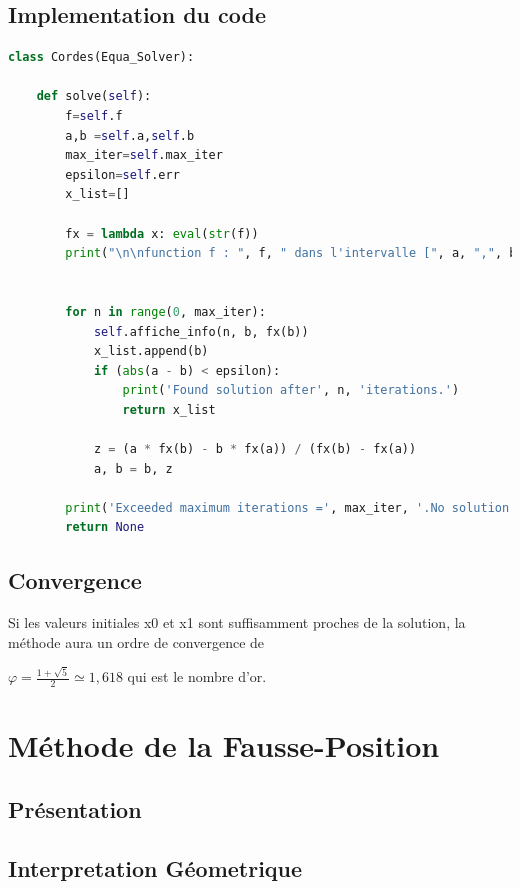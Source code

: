 \documentclass{article}
\begin{document}
\subsection{Implementation du code}
\begin{lstlisting}[language=Python, caption=Méthode des cordes en Python]
    class Cordes(Equa_Solver):
    
    def solve(self):
        f=self.f
        a,b =self.a,self.b
        max_iter=self.max_iter
        epsilon=self.err
        x_list=[]

        fx = lambda x: eval(str(f))
        print("\n\nfunction f : ", f, " dans l'intervalle [", a, ",", b, "] \n", "--------------------------------")


        for n in range(0, max_iter):
            self.affiche_info(n, b, fx(b))
            x_list.append(b)
            if (abs(a - b) < epsilon):
                print('Found solution after', n, 'iterations.')
                return x_list

            z = (a * fx(b) - b * fx(a)) / (fx(b) - fx(a))
            a, b = b, z

        print('Exceeded maximum iterations =', max_iter, '.No solution found.')
        return None
\end{lstlisting}
\newpage
\subsection{Convergence}
Si les valeurs initiales x0 et x1 sont suffisamment proches de la solution, la méthode aura un ordre de convergence de

${\displaystyle \varphi ={\frac {1+{\sqrt {5}}}{2}}\simeq 1,618} $ qui est le nombre d'or.






\newpage
\section{Méthode de la Fausse-Position}
\subsection{Présentation} 
    

\subsection{Interpretation Géometrique}
\end{document}
